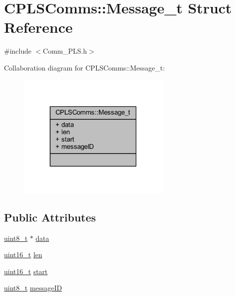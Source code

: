 \hypertarget{struct_c_p_l_s_comms_1_1_message__t}{}\section{C\+P\+L\+S\+Comms\+:\+:Message\+\_\+t Struct Reference}
\label{struct_c_p_l_s_comms_1_1_message__t}


{\ttfamily \#include $<$Comm\+\_\+\+P\+L\+S.\+h$>$}



Collaboration diagram for C\+P\+L\+S\+Comms\+:\+:Message\+\_\+t\+:\nopagebreak
\begin{figure}[H]
\begin{center}
\leavevmode
\includegraphics[width=210pt]{struct_c_p_l_s_comms_1_1_message__t__coll__graph}
\end{center}
\end{figure}
\subsection*{Public Attributes}
\begin{DoxyCompactItemize}
\item 
\mbox{\hyperlink{_a_d_a_s___types_8h_aba7bc1797add20fe3efdf37ced1182c5}{uint8\+\_\+t}} $\ast$ \mbox{\hyperlink{struct_c_p_l_s_comms_1_1_message__t_a75d42db0cfdf64c0fe1ed1e8b0c472ed}{data}}
\item 
\mbox{\hyperlink{_a_d_a_s___types_8h_a1f1825b69244eb3ad2c7165ddc99c956}{uint16\+\_\+t}} \mbox{\hyperlink{struct_c_p_l_s_comms_1_1_message__t_a3af5b7fed96b157285ec6c8168b64276}{len}}
\item 
\mbox{\hyperlink{_a_d_a_s___types_8h_a1f1825b69244eb3ad2c7165ddc99c956}{uint16\+\_\+t}} \mbox{\hyperlink{struct_c_p_l_s_comms_1_1_message__t_a760e6f39adfed2b0440477560654f02f}{start}}
\item 
\mbox{\hyperlink{_a_d_a_s___types_8h_aba7bc1797add20fe3efdf37ced1182c5}{uint8\+\_\+t}} \mbox{\hyperlink{struct_c_p_l_s_comms_1_1_message__t_a451cdd914ba11c33528a4761ad38faee}{message\+ID}}
\end{DoxyCompactItemize}


